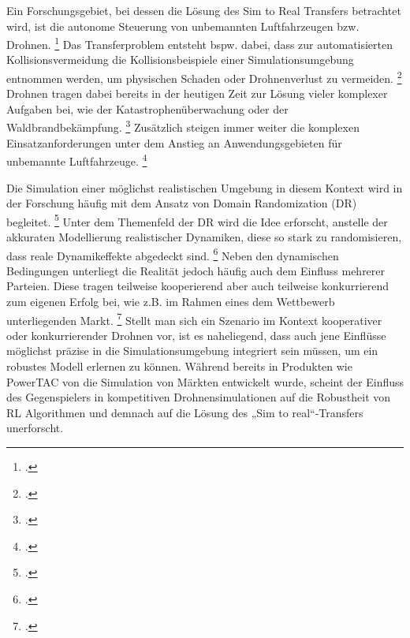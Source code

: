 Ein Forschungsgebiet, bei dessen die Lösung des Sim to Real Transfers betrachtet wird, ist die autonome Steuerung von unbemannten Luftfahrzeugen bzw. Drohnen. \footcite[Vgl.][S. 1]{Deshpande.2021}
Das Transferproblem entsteht bspw. dabei, dass zur automatisierten Kollisionsvermeidung die Kollisionsbeispiele einer Simulationsumgebung entnommen werden, um physischen Schaden oder Drohnenverlust zu vermeiden. \footcite[Vgl.][S. 4]{Sadeghi.2016}
Drohnen tragen dabei bereits in der heutigen Zeit zur Lösung vieler komplexer Aufgaben bei, wie der Katastrophenüberwachung oder der Waldbrandbekämpfung. \footcite[Vgl.][S. 1495]{Hentati.2018}
Zusätzlich steigen immer weiter die komplexen Einsatzanforderungen unter dem Anstieg an Anwendungsgebieten für unbemannte Luftfahrzeuge. \footcite[Vgl.][S. 1]{Deshpande.2020}

Die Simulation einer möglichst realistischen Umgebung in diesem Kontext wird in der Forschung häufig mit dem Ansatz von Domain Randomization (DR) begleitet. \footcite[Vgl.][S. 1]{Sadeghi.2016}
Unter dem Themenfeld der DR wird die Idee erforscht, anstelle der akkuraten Modellierung realistischer Dynamiken, diese so stark zu randomisieren, dass reale Dynamikeffekte abgedeckt sind. \footcite[Vgl.][S. 4f.]{Zhao.2020}
Neben den dynamischen Bedingungen unterliegt die Realität jedoch häufig auch dem Einfluss mehrerer Parteien.
Diese tragen teilweise kooperierend aber auch teilweise konkurrierend zum eigenen Erfolg bei, wie z.B. im Rahmen eines dem Wettbewerb unterliegenden Markt. \footcite[Vgl.][S. 2]{COLLINS2022101217}
Stellt man sich ein Szenario im Kontext kooperativer oder konkurrierender Drohnen vor, ist es naheliegend, dass auch jene Einflüsse möglichst präzise in die Simulationsumgebung integriert sein müssen, um ein robustes Modell erlernen zu können.
Während bereits in Produkten wie PowerTAC von \cite[][]{COLLINS2022101217} die Simulation von Märkten entwickelt wurde, scheint der Einfluss des Gegenspielers in kompetitiven Drohnensimulationen auf die Robustheit von RL Algorithmen und demnach auf die Lösung des „Sim to real“-Transfers unerforscht.